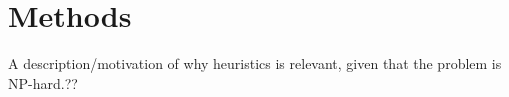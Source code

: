 \chapter{Methods}
A description/motivation of why heuristics is relevant, given that the problem is NP-hard.??







